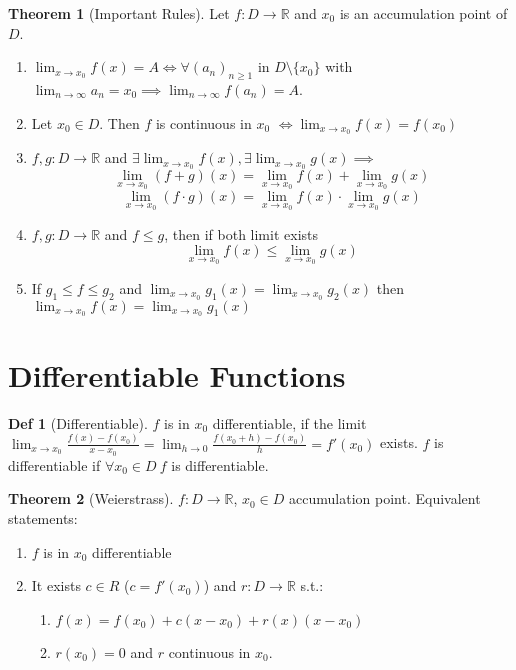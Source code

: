 \documentclass[a4paper, 10pt]{article}
\theoremstyle{definition}
\newtheorem*{definition}{Def}
\theoremstyle{named}
\newtheorem*{ntheorem_wrapper}{Theorem}
\newenvironment{ntheorem}%
    {\begin{mdframed}[style=important]\begin{ntheorem_wrapper}}%
    {\end{ntheorem_wrapper}\end{mdframed}}
\newcommand{\R}{\mathbb{R}}
\begin{document}
\begin{ntheorem}[Important Rules]
    Let $f: D \to \R$ and $x_0$ is an accumulation point of $D$.
    \begin{enumerate}
        \item $\lim_{x \to x_0} f(x) = A \iff \forall (a_n)_{n \geq 1}$ in $D \setminus \{x_0\}$ with $\lim_{n \to \infty} a_n = x_0 \implies \lim_{n \to \infty} f(a_n) = A$.
        \item Let $x_0 \in D$. Then $f$ is continuous in $x_0$ \newline $\iff \lim_{x \to x_0} f(x) = f(x_0)$
        \item $f, g: D \to \R$ and $\exists \lim_{x \to x_0} f(x), \exists \lim_{x \to x_0} g(x) \implies$
        $$\lim_{x \to x_0} (f + g)(x) = \lim_{x \to x_0} f(x) + \lim_{x \to x_0} g(x)$$
        $$\lim_{x \to x_0} (f \cdot g) (x) = \lim_{x \to x_0}f(x) \cdot \lim_{x \to x_0} g(x)$$
        \item $f, g: D \to \R$ and $f \leq g$, then if both limit exists
        $$\lim_{x \to x_0} f(x) \leq \lim_{x \to x_0} g(x)$$ 
        \item If $g_1 \leq f \leq g_2$ and $\lim_{x \to x_0} g_1(x) = \lim_{x \to x_0} g_2(x)$ then $\lim_{x \to x_0} f(x) = \lim_{x \to x_0} g_1(x)$
    \end{enumerate}
\end{ntheorem}

\section{Differentiable Functions}

\begin{definition}[Differentiable]
    $f$ is in $x_0$ differentiable, if the limit
    $\lim_{x \to x_0} \frac{f(x) - f(x_0)}{x - x_0} = \lim_{h \to 0} \frac{f(x_0 + h) - f(x_0)}{h} = f'(x_0)$ exists. $f$ is differentiable if $\forall x_0 \in D \ f$ is differentiable. 
\end{definition}

\begin{ntheorem}[Weierstrass]
    $f: D \to \R$, $x_0 \in D$ accumulation point. Equivalent statements:
    \begin{enumerate}
        \item $f$ is in $x_0$ differentiable
        \item It exists $c \in R$ ($c = f'(x_0)$) and $r: D \to \R$ s.t.:
            \begin{enumerate}
                \item $f(x) = f(x_0) + c(x - x_0) + r(x)(x - x_0)$
                \item $r(x_0) = 0$ and $r$ continuous in $x_0$.
            \end{enumerate}
    \end{enumerate}
\end{ntheorem}
\end{document}
